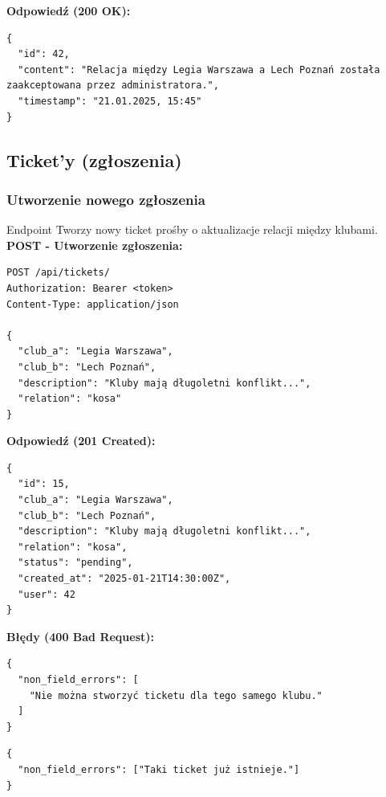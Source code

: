 \documentclass[a4paper,12pt]{article}
\begin{document}
\textbf{Odpowiedź (200 OK):}
\begin{lstlisting}
{
  "id": 42,
  "content": "Relacja między Legia Warszawa a Lech Poznań została zaakceptowana przez administratora.",
  "timestamp": "21.01.2025, 15:45"
}
\end{lstlisting}

\newpage

\subsection{Ticket'y (zgłoszenia)}

\subsubsection{Utworzenie nowego zgłoszenia}

Endpoint Tworzy nowy ticket prośby o aktualizacje relacji między klubami. \\

\textbf{POST - Utworzenie zgłoszenia:}
\begin{lstlisting}
POST /api/tickets/
Authorization: Bearer <token>
Content-Type: application/json

{
  "club_a": "Legia Warszawa",
  "club_b": "Lech Poznań",
  "description": "Kluby mają długoletni konflikt...",
  "relation": "kosa"
}
\end{lstlisting}

\vspace{0.5cm}

\textbf{Odpowiedź (201 Created):}
\begin{lstlisting}
{
  "id": 15,
  "club_a": "Legia Warszawa",
  "club_b": "Lech Poznań",
  "description": "Kluby mają długoletni konflikt...",
  "relation": "kosa",
  "status": "pending",
  "created_at": "2025-01-21T14:30:00Z",
  "user": 42
}
\end{lstlisting}

\vspace{0.5cm}

\textbf{Błędy (400 Bad Request):}
\begin{lstlisting}
{
  "non_field_errors": [
    "Nie można stworzyć ticketu dla tego samego klubu."
  ]
}
\end{lstlisting}

\begin{lstlisting}
{
  "non_field_errors": ["Taki ticket już istnieje."]
}
\end{lstlisting}

\newpage
\end{document}
